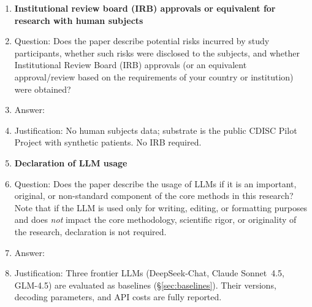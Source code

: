 \begin{enumerate}
\item {\bf Institutional review board (IRB) approvals or equivalent for research with human subjects}
    \item[] Question: Does the paper describe potential risks incurred by study participants, whether such risks were disclosed to the subjects, and whether Institutional Review Board (IRB) approvals (or an equivalent approval/review based on the requirements of your country or institution) were obtained?
    \item[] Answer: \answerNA{}
    \item[] Justification: No human subjects data; substrate is the public CDISC Pilot Project with synthetic patients. No IRB required.

\item {\bf Declaration of LLM usage}
    \item[] Question: Does the paper describe the usage of LLMs if it is an important, original, or non-standard component of the core methods in this research? Note that if the LLM is used only for writing, editing, or formatting purposes and does \emph{not} impact the core methodology, scientific rigor, or originality of the research, declaration is not required.
    \item[] Answer: \answerYes{}
    \item[] Justification: Three frontier LLMs (DeepSeek-Chat, Claude Sonnet~4.5, GLM-4.5) are evaluated as baselines (\S\ref{sec:baselines}). Their versions, decoding parameters, and API costs are fully reported.

\end{enumerate}


